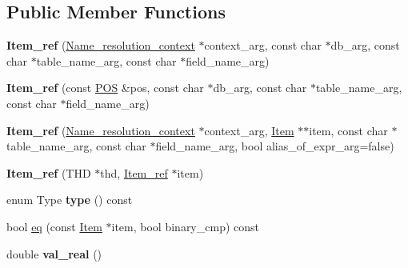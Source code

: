 \subsection*{Public Member Functions}
\begin{DoxyCompactItemize}
\item 
\mbox{\label{classItem__ref_a0fd24498dc80f663c9fdca757a8f8391}} 
{\bfseries Item\+\_\+ref} (\mbox{\hyperlink{structName__resolution__context}{Name\+\_\+resolution\+\_\+context}} $\ast$context\+\_\+arg, const char $\ast$db\+\_\+arg, const char $\ast$table\+\_\+name\+\_\+arg, const char $\ast$field\+\_\+name\+\_\+arg)
\item 
\mbox{\label{classItem__ref_a967ac9d2c80c982d5560187fea78837b}} 
{\bfseries Item\+\_\+ref} (const \mbox{\hyperlink{structYYLTYPE}{P\+OS}} \&pos, const char $\ast$db\+\_\+arg, const char $\ast$table\+\_\+name\+\_\+arg, const char $\ast$field\+\_\+name\+\_\+arg)
\item 
\mbox{\label{classItem__ref_a8bd74107d82a5c73e807aad56d311d5e}} 
{\bfseries Item\+\_\+ref} (\mbox{\hyperlink{structName__resolution__context}{Name\+\_\+resolution\+\_\+context}} $\ast$context\+\_\+arg, \mbox{\hyperlink{classItem}{Item}} $\ast$$\ast$item, const char $\ast$table\+\_\+name\+\_\+arg, const char $\ast$field\+\_\+name\+\_\+arg, bool alias\+\_\+of\+\_\+expr\+\_\+arg=false)
\item 
\mbox{\label{classItem__ref_a460de52de702e62c74a78e7edab182ba}} 
{\bfseries Item\+\_\+ref} (T\+HD $\ast$thd, \mbox{\hyperlink{classItem__ref}{Item\+\_\+ref}} $\ast$item)
\item 
\mbox{\label{classItem__ref_ae490e23205477d77ee09ff4dce4dae69}} 
enum Type {\bfseries type} () const
\item 
bool \mbox{\hyperlink{classItem__ref_aeeefca8b7da367005015a5f978e9753b}{eq}} (const \mbox{\hyperlink{classItem}{Item}} $\ast$item, bool binary\+\_\+cmp) const
\item 
\mbox{\label{classItem__ref_ae11308112ae4ca6f75b4f1cecf1065cb}} 
double {\bfseries val\+\_\+real} ()
\item 
\mbox{\label{classItem__ref_a324e6674aaba706e68bba5b339d4b24a}} 
$$
\end{DoxyCompactItemize}
